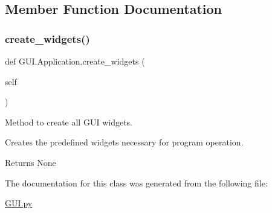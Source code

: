 \subsection{Member Function Documentation}
\hypertarget{class_g_u_i_1_1_application_a84a6c38f860f505a4bb7a0356393d24a}{}\label{class_g_u_i_1_1_application_a84a6c38f860f505a4bb7a0356393d24a} 
\subsubsection{\texorpdfstring{create\+\_\+widgets()}{create\_widgets()}}
{\footnotesize\ttfamily def G\+U\+I.\+Application.\+create\+\_\+widgets (\begin{DoxyParamCaption}\item[{}]{self }\end{DoxyParamCaption})}



Method to create all G\+UI widgets. 

Creates the predefined widgets necessary for program operation. \begin{DoxyReturn}{Returns}
None 
\end{DoxyReturn}


The documentation for this class was generated from the following file\+:\begin{DoxyCompactItemize}
\item 
\hyperlink{_g_u_i_8py}{G\+U\+I.\+py}\end{DoxyCompactItemize}
